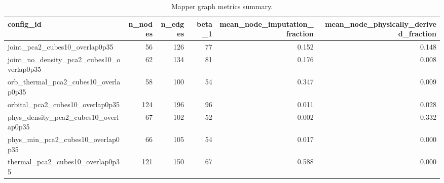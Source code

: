 \begin{table}
\caption{Mapper graph metrics summary.}
\label{tab:mapper_graph_metrics_summary}
\begin{tabular}{lrrrrr}
\toprule
config\_id & n\_nodes & n\_edges & beta\_1 & mean\_node\_imputation\_fraction & mean\_node\_physically\_derived\_fraction \\
\midrule
joint\_pca2\_cubes10\_overlap0p35 & 56 & 126 & 77 & 0.152 & 0.148 \\
joint\_no\_density\_pca2\_cubes10\_overlap0p35 & 62 & 134 & 81 & 0.176 & 0.008 \\
orb\_thermal\_pca2\_cubes10\_overlap0p35 & 58 & 100 & 54 & 0.347 & 0.009 \\
orbital\_pca2\_cubes10\_overlap0p35 & 124 & 196 & 96 & 0.011 & 0.028 \\
phys\_density\_pca2\_cubes10\_overlap0p35 & 67 & 102 & 52 & 0.002 & 0.332 \\
phys\_min\_pca2\_cubes10\_overlap0p35 & 66 & 105 & 54 & 0.017 & 0.000 \\
thermal\_pca2\_cubes10\_overlap0p35 & 121 & 150 & 67 & 0.588 & 0.000 \\
\bottomrule
\end{tabular}
\end{table}
